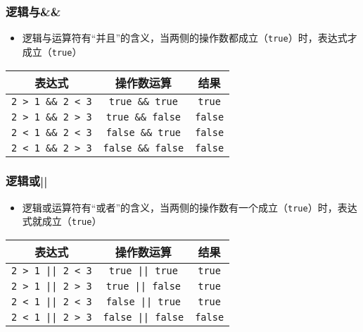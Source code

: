\begin{frame}[fragile]
    \frametitle{逻辑与\enspace\&\&}

    \begin{itemize}
        \item 逻辑与运算符有“并且”的含义，当两侧的操作数都成立（\lstinline|true|）时，表达式才成立（\lstinline|true|）
    \end{itemize}

    \begin{table}[]
        \begin{tabular}{ccc}
            \toprule
            表达式                     & 操作数运算                 & 结果              \\
            \midrule
            \lstinline|2 > 1 && 2 < 3| & \lstinline|true && true|   & \lstinline|true|  \\
            \lstinline|2 > 1 && 2 > 3| & \lstinline|true && false|  & \lstinline|false| \\
            \lstinline|2 < 1 && 2 < 3| & \lstinline|false && true|  & \lstinline|false| \\
            \lstinline|2 < 1 && 2 > 3| & \lstinline|false && false| & \lstinline|false| \\
            \bottomrule
        \end{tabular}
    \end{table}
\end{frame}

\begin{frame}[fragile]
    \frametitle{逻辑或\enspace||}

    \begin{itemize}
        \item 逻辑或运算符有“或者”的含义，当两侧的操作数有一个成立（\lstinline|true|）时，表达式就成立（\lstinline|true|） 
    \end{itemize}

    \begin{table}[]
        \begin{tabular}{ccc}
            \toprule
            表达式                     & 操作数运算                 & 结果              \\
            \midrule
            \lstinline!2 > 1 || 2 < 3! & \lstinline!true || true!   & \lstinline!true!  \\
            \lstinline!2 > 1 || 2 > 3! & \lstinline!true || false!  & \lstinline!true!  \\
            \lstinline!2 < 1 || 2 < 3! & \lstinline!false || true!  & \lstinline!true!  \\
            \lstinline!2 < 1 || 2 > 3! & \lstinline!false || false! & \lstinline!false! \\
            \bottomrule
        \end{tabular}
    \end{table}
\end{frame}

